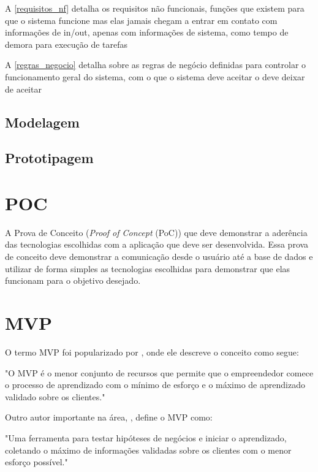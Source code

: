 \documentclass[
	article,			%
	12pt,				%
	oneside,			%
	a4paper,			%
    BIBLATEX,           %
	english,			%
	brazil,				%
	sumario=tradicional
	]{abntex2}
\begin{document}
A \autoref{requisitos_nf} detalha os requisitos não funcionais, funções que existem para que o sistema funcione mas elas jamais chegam a entrar em contato com informações de in/out, apenas com informações de sistema, como tempo de demora para execução de tarefas

A \autoref{regras_negocio} detalha sobre as regras de negócio definidas para controlar o funcionamento geral do sistema, com o que o sistema deve aceitar o deve deixar de aceitar


\subsection{Modelagem}

\subsection{Prototipagem}

\section{POC}

A Prova de Conceito (\textit{Proof of Concept} (PoC)) que deve demonstrar a aderência das tecnologias escolhidas com a aplicação que deve ser desenvolvida. Essa prova de conceito deve demonstrar a comunicação desde o usuário até a base de dados e utilizar de forma simples as tecnologias escolhidas para demonstrar que
elas funcionam para o objetivo desejado.

\section{MVP}

O termo MVP foi popularizado por  , onde ele descreve o conceito como segue:

"O MVP é o menor conjunto de recursos que permite que o empreendedor comece o processo de aprendizado com o mínimo de esforço e o máximo de aprendizado validado sobre os clientes."

Outro autor importante na área, , define o MVP como:

"Uma ferramenta para testar hipóteses de negócios e iniciar o aprendizado, coletando o máximo de informações validadas sobre os clientes com o menor esforço possível."


% 
\end{document}
